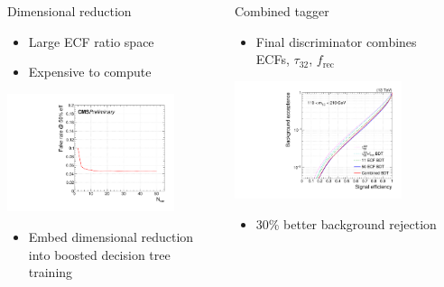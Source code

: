 \documentclass[aspectratio=169,xcolor=dvipsnames,,table,compress]{beamer}
\begin{document}
\begin{frame}[t]
\begin{columns}[T]
\begin{column}{0.33\textwidth}
  \end{column}
  \begin{column}{0.33\textwidth}
  \centering 
    Dimensional reduction \\  
  \begin{itemize}
    \item {\small Large ECF ratio space}
    \item {\small Expensive to compute }
  \end{itemize}
      \includegraphics[width=0.8\textwidth]{../figures/toptagging/bdt/fakerate_vs_eff50.pdf}
      \vspace{-5mm}
  \begin{itemize}
    \item {\small Embed dimensional reduction into boosted decision tree training}
  \end{itemize}
  \end{column}
  \begin{column}{0.33\textwidth}
    \centering 
    Combined tagger \\ 
    \begin{itemize}
      \item {\small Final discriminator combines ECFs, $\tau_{32}$, $f_\mathrm{rec}$ }
    \end{itemize}
      \includegraphics[width=0.8\textwidth]{../figures/toptagging/bdt/roc.pdf}
      \vspace{-3mm}
    \begin{itemize}
      \item {\small 30\% better background rejection }
    \end{itemize}
  \end{column}
  \end{columns}
\end{frame}
\end{document}
